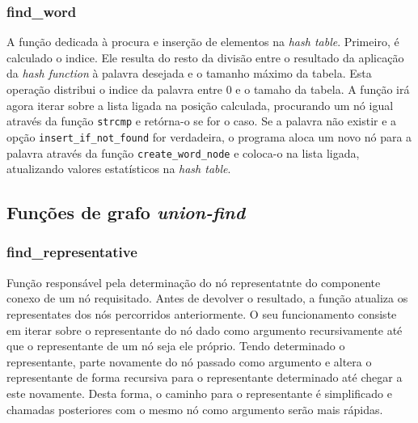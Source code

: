 \documentclass[portuguese,11pt,a4paper,titlepage]{article}
\newcommand{\foreign}[1]{\textit{#1}}
\begin{document}
\subsubsection{find\_word}
A função dedicada à procura e inserção de elementos na \foreign{hash table}. Primeiro, é
calculado o indice. Ele resulta do resto da divisão entre o resultado da
aplicação da \foreign{hash function} à palavra desejada e o tamanho máximo da tabela. Esta operação distribui o indice da palavra entre 0 e o tamaho da tabela. A função irá agora
iterar sobre a lista ligada na posição calculada, procurando um nó igual através da
função \verb|strcmp| e retórna-o se for o caso. Se a palavra não existir e a opção
\verb|insert_if_not_found| for verdadeira, o programa aloca um novo nó para a palavra
através da função \verb|create_word_node| e coloca-o na lista ligada, atualizando valores
estatísticos na \foreign{hash table}.

\subsection{Funções de grafo \foreign{union-find}}

\subsubsection{find\_representative}
Função responsável pela determinação do nó representatnte do componente conexo de um
nó requisitado. Antes de devolver o resultado, a função atualiza os representates dos 
nós percorridos anteriormente. O seu funcionamento consiste em iterar sobre
o representante do nó dado como argumento recursivamente até que o representante de um nó seja ele próprio.
Tendo determinado o representante, parte novamente do nó passado como argumento e altera
o representante de forma recursiva para o representante determinado até chegar a este novamente. Desta forma, o caminho para o representante é simplificado e chamadas posteriores
com o mesmo nó como argumento serão mais rápidas.
\end{document}
